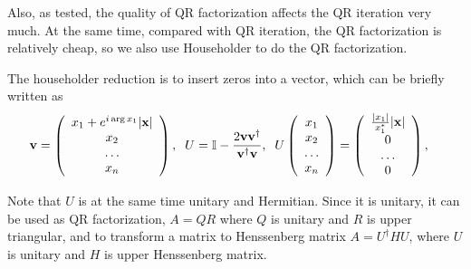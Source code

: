 Also, as tested, the quality of QR factorization affects the QR iteration very much. At the same time, compared with QR iteration, the QR factorization is relatively cheap, so we also use Householder to do the QR factorization.

The householder reduction is to insert zeros into a vector, which can be briefly written as
\begin{equation}
\begin{split}
&{\bf v}=\left(\begin{array}{c} x_1+e^{i \arg{x_1}}|{\bf x}|\\x_2\\ \ldots \\ x_n\end{array}\right),\;\;U=\mathbb{I}-\frac{2{\bf v}{\bf v}^{\dagger}}{{\bf v}^{\dagger}{\bf v}},\;\;U\left(\begin{array}{c} x_1\\x_2\\ \ldots \\ x_n\end{array}\right)=\left(\begin{array}{c} \frac{|x_1|}{x_1^*}|{\bf x}|\\0\\ \ldots \\ 0\end{array}\right),
\end{split}
\end{equation}

Note that $U$ is at the same time unitary and Hermitian. Since it is unitary, it can be used as QR factorization, $A=QR$ where $Q$ is unitary and $R$ is upper triangular, and to transform a matrix to Henssenberg matrix $A=U^{\dagger}HU$, where $U$ is unitary and $H$ is upper Henssenberg matrix.

